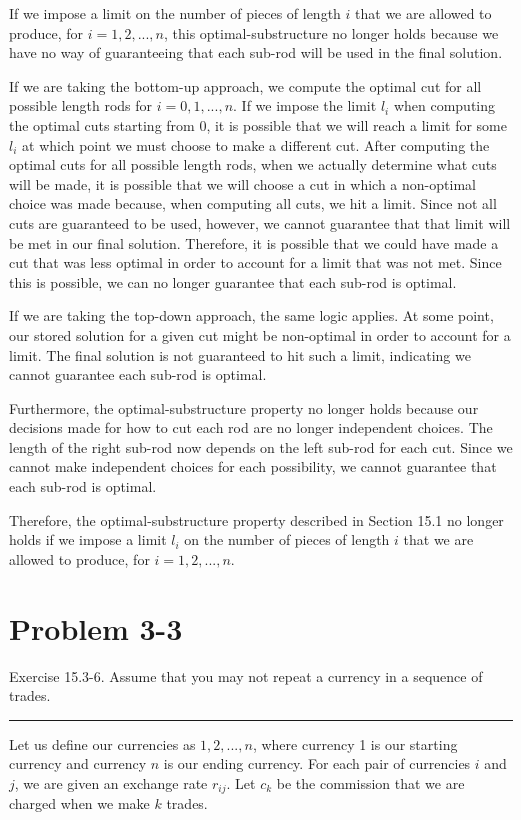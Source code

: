 \documentclass[11pt]{article}
\def\separateline{\medskip\hrule\medskip}
\begin{document}
If we impose a limit on the number of pieces of length $i$ that we are allowed to produce, for $i=1, 2, ..., n$, this optimal-substructure no longer holds because we have no way of guaranteeing that each sub-rod will be used in the final solution.

If we are taking the bottom-up approach, we compute the optimal cut for all possible length rods for $i=0, 1, ..., n$. If we impose the limit $l_i$ when computing the optimal cuts starting from 0, it is possible that we will reach a limit for some $l_i$ at which point we must choose to make a different cut. After computing the optimal cuts for all possible length rods, when we actually determine what cuts will be made, it is possible that we will choose a cut in which a non-optimal choice was made because, when computing all cuts, we hit a limit. Since not all cuts are guaranteed to be used, however, we cannot guarantee that that limit will be met in our final solution. Therefore, it is possible that we could have made a cut that was less optimal in order to account for a limit that was not met. Since this is possible, we can no longer guarantee that each sub-rod is optimal.

If we are taking the top-down approach, the same logic applies. At some point, our stored solution for a given cut might be non-optimal in order to account for a limit. The final solution is not guaranteed to hit such a limit, indicating we cannot guarantee each sub-rod is optimal.

Furthermore, the optimal-substructure property no longer holds because our decisions made for how to cut each rod are no longer independent choices. The length of the right sub-rod now depends on the left sub-rod for each cut. Since we cannot make independent choices for each possibility, we cannot guarantee that each sub-rod is optimal.

Therefore, the optimal-substructure property described in Section 15.1 no longer holds if we impose a limit $l_i$ on the number of pieces of length $i$ that we are allowed to produce, for $i=1, 2, ..., n$.

\newpage

\section{Problem 3-3}
Exercise 15.3-6. Assume that you may not repeat a currency in a sequence of trades.
\separateline

Let us define our currencies as $1, 2, ..., n$, where currency 1 is our starting currency and currency $n$ is our ending currency. For each pair of currencies $i$ and $j$, we are given an exchange rate $r_{ij}$. Let $c_k$ be the commission that we are charged when we make $k$ trades.
\end{document}
